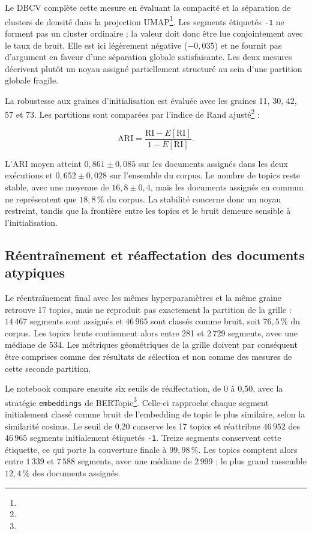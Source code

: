 Le DBCV complète cette mesure en évaluant la compacité et la séparation de clusters de densité dans la projection UMAP\footnote{}. Les segments étiquetés \texttt{-1} ne forment pas un cluster ordinaire ; la valeur doit donc être lue conjointement avec le taux de bruit. Elle est ici légèrement négative (\(-0{,}035\)) et ne fournit pas d'argument en faveur d'une séparation globale satisfaisante. Les deux mesures décrivent plutôt un noyau assigné partiellement structuré au sein d'une partition globale fragile.

La robustesse aux graines d'initialisation est évaluée avec les graines 11, 30, 42, 57 et 73. Les partitions sont comparées par l'indice de Rand ajusté\footnote{} :

\[
\mathrm{ARI}
=
\frac{\mathrm{RI}-E[\mathrm{RI}]}
{1-E[\mathrm{RI}]}.
\]

L'ARI moyen atteint \(0{,}861\pm0{,}085\) sur les documents assignés dans les deux exécutions et \(0{,}652\pm0{,}028\) sur l'ensemble du corpus. Le nombre de topics reste stable, avec une moyenne de \(16{,}8\pm0{,}4\), mais les documents assignés en commun ne représentent que \(18{,}8\,\%\) du corpus. La stabilité concerne donc un noyau restreint, tandis que la frontière entre les topics et le bruit demeure sensible à l'initialisation.

\subsection{Réentraînement et réaffectation des documents atypiques}

Le réentraînement final avec les mêmes hyperparamètres et la même graine retrouve 17 topics, mais ne reproduit pas exactement la partition de la grille : \(14\,467\) segments sont assignés et \(46\,965\) sont classés comme bruit, soit \(76{,}5\,\%\) du corpus. Les topics bruts contiennent alors entre 281 et \(2\,729\) segments, avec une médiane de 534. Les métriques géométriques de la grille doivent par conséquent être comprises comme des résultats de sélection et non comme des mesures de cette seconde partition.

Le notebook compare ensuite six seuils de réaffectation, de 0 à 0,50, avec la stratégie \texttt{embeddings} de BERTopic\footnote{}. Celle-ci rapproche chaque segment initialement classé comme bruit de l'embedding de topic le plus similaire, selon la similarité cosinus. Le seuil de 0,20 conserve les 17 topics et réattribue \(46\,952\) des \(46\,965\) segments initialement étiquetés \texttt{-1}. Treize segments conservent cette étiquette, ce qui porte la couverture finale à \(99{,}98\,\%\). Les topics comptent alors entre \(1\,339\) et \(7\,588\) segments, avec une médiane de \(2\,999\) ; le plus grand rassemble \(12{,}4\,\%\) des documents assignés.

